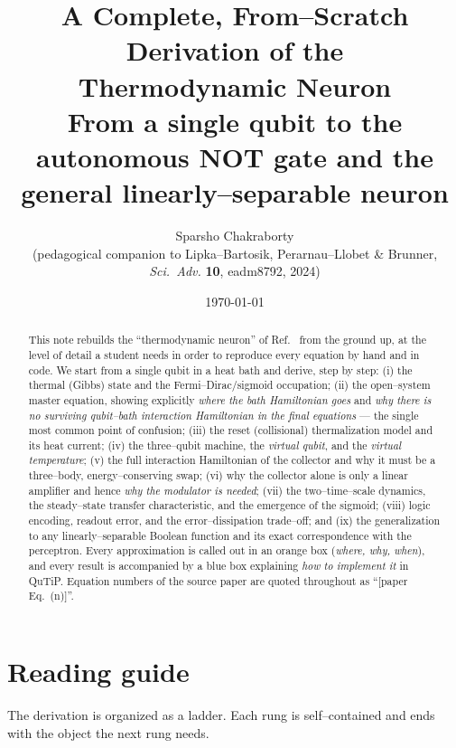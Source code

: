 \documentclass[11pt,a4paper]{article}
\title{\bfseries A Complete, From--Scratch Derivation of the\\
Thermodynamic Neuron\\[4pt]
\large From a single qubit to the autonomous NOT gate and the general
linearly--separable neuron}
\author{Sparsho Chakraborty\\[2pt]
\small (pedagogical companion to Lipka--Bartosik, Perarnau--Llobet \&
Brunner, \emph{Sci.\ Adv.} \textbf{10}, eadm8792, 2024)}
\date{\today}
\theoremstyle{definition}
\theoremstyle{remark}
\begin{document}
\maketitle

\begin{abstract}
\noindent
This note rebuilds the ``thermodynamic neuron'' of
Ref.~\cite{LipkaBartosik2024} from the ground up, at the level of detail
a student needs in order to reproduce every equation by hand and in
code. We start from a single qubit in a heat bath and derive, step by
step: (i) the thermal (Gibbs) state and the Fermi--Dirac/sigmoid
occupation; (ii) the open--system master equation, showing explicitly
\emph{where the bath Hamiltonian goes} and \emph{why there is no
surviving qubit--bath interaction Hamiltonian in the final equations}
--- the single most common point of confusion; (iii) the reset
(collisional) thermalization model and its heat current; (iv) the
three--qubit machine, the \emph{virtual qubit}, and the \emph{virtual
temperature}; (v) the full interaction Hamiltonian of the collector and
why it must be a three--body, energy--conserving swap; (vi) why the
collector alone is only a linear amplifier and hence \emph{why the
modulator is needed}; (vii) the two--time--scale dynamics, the
steady--state transfer characteristic, and the emergence of the sigmoid;
(viii) logic encoding, readout error, and the error--dissipation
trade--off; and (ix) the generalization to any linearly--separable
Boolean function and its exact correspondence with the perceptron. Every
approximation is called out in an orange box (\emph{where, why, when}),
and every result is accompanied by a blue box explaining \emph{how to
implement it} in QuTiP. Equation numbers of the source paper are quoted
throughout as ``[paper Eq.~(n)]''.
\end{abstract}

\tableofcontents
\newpage

\part*{Reading guide}

The derivation is organized as a ladder. Each rung is self--contained and
ends with the object the next rung needs.
\end{document}
